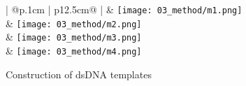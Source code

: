 
\graphicspath{{/Users/mohammedalshamrani/Downloads/School/Waldispul/Publishing/Paper_04/fig/}}
\setlength\fboxsep{0pt} %
\setlength\fboxrule{1pt} %
\usepackage[percent]{overpic}
\usepackage[export]{adjustbox}

\newpage
		
		\begin{comment}
				\begin{figure}[h]
					\texttt{[image: 01\_schematics/aseq.png]} 
					\caption{schematic}
					\label{fig:schematic}
				\end{figure}
		\end{comment}
		\begin{figure}[H]
			\begin{table}[H]
				\centering
				\begin{tabular}{{  | @{}p{.1cm} | p{12.5cm}@{} |   }}				
					\toprule
					 & \texttt{[image: 03\_method/m1.png]} 
					\\ \midrule\midrule\midrule\midrule  %
					 & \texttt{[image: 03\_method/m2.png]} 
					\\ \midrule\midrule\midrule\midrule  
					 & \texttt{[image: 03\_method/m3.png]}  
					\\ \midrule\midrule\midrule\midrule  
					 & \texttt{[image: 03\_method/m4.png]} 
					\\ \bottomrule
				\end{tabular}
			\end{table}		
			\caption{Construction of dsDNA templates}
			\label{fig:method}	
		\end{figure}

		
\printbibliography
